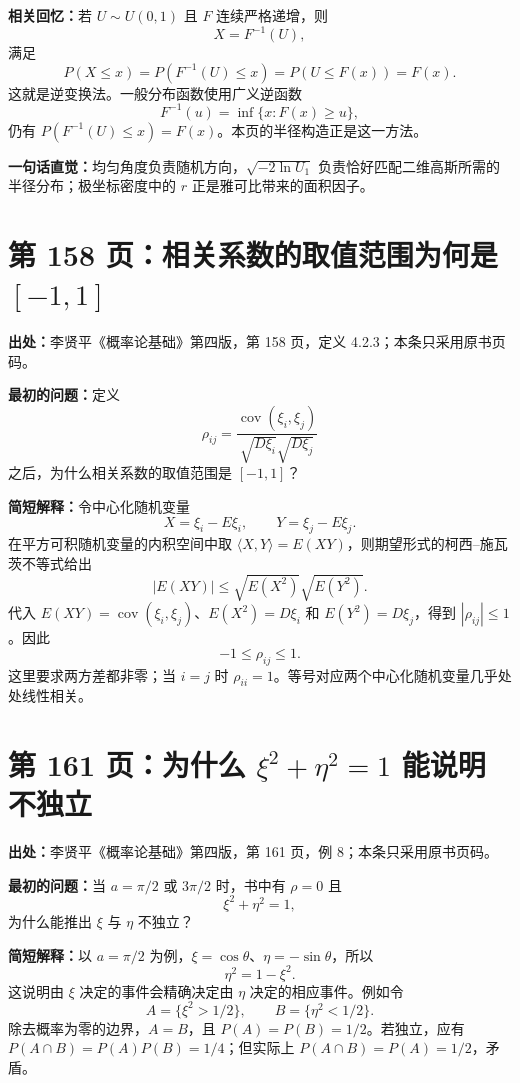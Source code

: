 \documentclass[UTF8,a4paper,11pt]{ctexart}
\begin{document}
\textbf{相关回忆：}若 $U\sim U(0,1)$ 且 $F$ 连续严格递增，则
\[
X=F^{-1}(U),
\]
满足
\[
P(X\le x)=P(F^{-1}(U)\le x)=P(U\le F(x))=F(x).
\]
这就是逆变换法。一般分布函数使用广义逆函数
\[
F^{-1}(u)=\inf\{x:F(x)\ge u\},
\]
仍有 $P(F^{-1}(U)\le x)=F(x)$。本页的半径构造正是这一方法。

\textbf{一句话直觉：}均匀角度负责随机方向，$\sqrt{-2\ln U_1}$ 负责恰好匹配二维高斯所需的半径分布；极坐标密度中的 $r$ 正是雅可比带来的面积因子。

\newpage
\section{第 158 页：相关系数的取值范围为何是 $[-1,1]$}
\label{note:probability-p158-correlation-range}
\textbf{出处：}李贤平《概率论基础》第四版，第 158 页，定义 4.2.3；本条只采用原书页码。

\textbf{最初的问题：}定义
\[
\rho_{ij}=\frac{\operatorname{cov}(\xi_i,\xi_j)}{\sqrt{D\xi_i}\sqrt{D\xi_j}}
\]
之后，为什么相关系数的取值范围是 $[-1,1]$？

\textbf{简短解释：}令中心化随机变量
\[
X=\xi_i-E\xi_i,\qquad Y=\xi_j-E\xi_j.
\]
在平方可积随机变量的内积空间中取 $\langle X,Y\rangle=E(XY)$，则期望形式的柯西--施瓦茨不等式给出
\[
|E(XY)|\le \sqrt{E(X^2)}\sqrt{E(Y^2)}.
\]
代入 $E(XY)=\operatorname{cov}(\xi_i,\xi_j)$、$E(X^2)=D\xi_i$ 和
$E(Y^2)=D\xi_j$，得到 $|\rho_{ij}|\le1$。因此
\[
-1\le\rho_{ij}\le1.
\]
这里要求两方差都非零；当 $i=j$ 时 $\rho_{ii}=1$。等号对应两个中心化随机变量几乎处处线性相关。

\newpage
\section{第 161 页：为什么 $\xi^2+\eta^2=1$ 能说明不独立}
\label{note:probability-p161-uncorrelated-dependent}
\textbf{出处：}李贤平《概率论基础》第四版，第 161 页，例 8；本条只采用原书页码。

\textbf{最初的问题：}当 $a=\pi/2$ 或 $3\pi/2$ 时，书中有 $\rho=0$ 且
\[
\xi^2+\eta^2=1,
\]
为什么能推出 $\xi$ 与 $\eta$ 不独立？

\textbf{简短解释：}以 $a=\pi/2$ 为例，$\xi=\cos\theta$、$\eta=-\sin\theta$，所以
\[
\eta^2=1-\xi^2.
\]
这说明由 $\xi$ 决定的事件会精确决定由 $\eta$ 决定的相应事件。例如令
\[
A=\{\xi^2>1/2\},\qquad B=\{\eta^2<1/2\}.
\]
除去概率为零的边界，$A=B$，且 $P(A)=P(B)=1/2$。若独立，应有
$P(A\cap B)=P(A)P(B)=1/4$；但实际上 $P(A\cap B)=P(A)=1/2$，矛盾。
\end{document}
